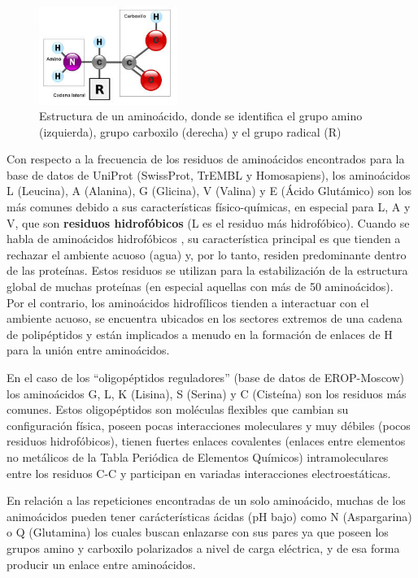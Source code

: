 \begin{figure}[h]
    \centering
    \includegraphics[width=0.4\textwidth]{./images/estructura2.jpeg}
    \caption{Estructura de un aminoácido, donde se identifica el grupo amino (izquierda), grupo carboxilo (derecha) y el grupo radical (R)}
    \label{fig:imple3}
\end{figure}

Con respecto a la frecuencia de los residuos de aminoácidos encontrados para la base de datos de UniProt (SwissProt, TrEMBL y Homosapiens), los aminoácidos L (Leucina), A (Alanina), G (Glicina), V (Valina) y E (Ácido Glutámico) son los más comunes debido a sus características físico-químicas, en especial para L, A y V, que son \textbf{residuos hidrofóbicos} (L es el residuo más hidrofóbico). Cuando se habla de aminoácidos hidrofóbicos \cite{quimicaaminoacidos}, su característica principal es que tienden a rechazar el ambiente acuoso (agua) y, por lo tanto, residen predominante dentro de las proteínas. Estos residuos se utilizan para la estabilización de la estructura global de muchas proteínas (en especial aquellas con más de 50 aminoácidos).\\
Por el contrario, los aminoácidos hidrofílicos tienden a interactuar con el ambiente acuoso, se encuentra ubicados en los sectores extremos de una cadena de polipéptidos y están implicados a menudo en la formación de enlaces de H para la unión entre aminoácidos.

En el caso de los ``oligopéptidos reguladores'' (base de datos de EROP-Moscow) los aminoácidos G, L, K (Lisina), S (Serina) y C (Cisteína) son los residuos más comunes. Estos oligopéptidos \cite{zamyatnin3} son moléculas flexibles que cambian su configuración física, poseen pocas interacciones moleculares y muy débiles (pocos residuos hidrofóbicos), tienen fuertes enlaces covalentes (enlaces entre elementos no metálicos de la Tabla Periódica de Elementos Químicos) intramoleculares entre los residuos C-C y participan en variadas interacciones electroestáticas.

En relación a las repeticiones encontradas de un solo aminoácido, muchas de los animoácidos pueden tener carácterísticas ácidas (pH bajo) como N (Aspargarina) o Q (Glutamina) los cuales buscan enlazarse con sus pares ya que poseen los grupos amino y carboxilo polarizados a nivel de carga eléctrica, y de esa forma producir un enlace entre aminoácidos.